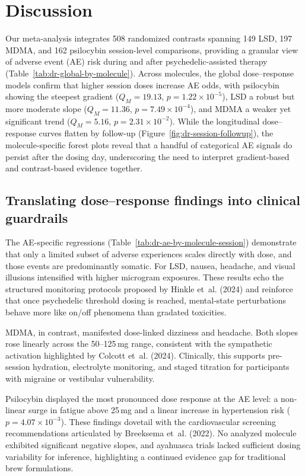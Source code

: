 \section{Discussion}

Our meta-analysis integrates 508 randomized contrasts spanning 149 LSD, 197 MDMA, and 162 psilocybin session-level comparisons, providing a granular view of adverse event (AE) risk during and after psychedelic-assisted therapy (Table~\ref{tab:dr-global-by-molecule}).
Across molecules, the global dose--response models confirm that higher session doses increase AE odds, with psilocybin showing the steepest gradient ($Q_M=19.13$, $p=1.22\times10^{-5}$), LSD a robust but more moderate slope ($Q_M=11.36$, $p=7.49\times10^{-4}$), and MDMA a weaker yet significant trend ($Q_M=5.16$, $p=2.31\times10^{-2}$).
While the longitudinal dose--response curves flatten by follow-up (Figure~\ref{fig:dr-session-followup}), the molecule-specific forest plots reveal that a handful of categorical AE signals do persist after the dosing day, underscoring the need to interpret gradient-based and contrast-based evidence together.

\subsection{Translating dose--response findings into clinical guardrails}

The AE-specific regressions (Table~\ref{tab:dr-ae-by-molecule-session}) demonstrate that only a limited subset of adverse experiences scales directly with dose, and those events are predominantly somatic.
For LSD, nausea, headache, and visual illusions intensified with higher microgram exposures.
These results echo the structured monitoring protocols proposed by Hinkle et~al. (2024) and reinforce that once psychedelic threshold dosing is reached, mental-state perturbations behave more like on/off phenomena than gradated toxicities.

MDMA, in contrast, manifested dose-linked dizziness and headache.
Both slopes rose linearly across the 50--125\,mg range, consistent with the sympathetic activation highlighted by Colcott et~al. (2024).
Clinically, this supports pre-session hydration, electrolyte monitoring, and staged titration for participants with migraine or vestibular vulnerability.

Psilocybin displayed the most pronounced dose response at the AE level: a non-linear surge in fatigue above 25\,mg and a linear increase in hypertension risk ($p=4.07\times10^{-3}$).
These findings dovetail with the cardiovascular screening recommendations articulated by Breeksema et~al. (2022).
No analyzed molecule exhibited significant negative slopes, and ayahuasca trials lacked sufficient dosing variability for inference, highlighting a continued evidence gap for traditional brew formulations.

